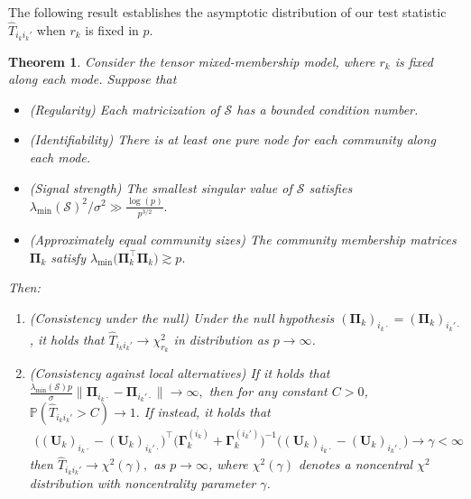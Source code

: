 \documentclass[10pt]{article}
\newcommand{\0}{{\mathbf{0}}}
\newcommand{\1}{{\mathbf{1}}}
\newcommand{\U}{{\mathbf{U}}}
\renewcommand{\t}{^{\top}}
\newtheorem{theorem}{Theorem}
\newcommand{\p}{\mathbb{P}}
\renewcommand{\hat}{\widehat}
\renewcommand{\hat}{\widehat}
\begin{document}
The following result establishes the asymptotic distribution of our test statistic  $\hat T_{i_k i_k'}$ when $r_k$ is fixed in $p$. 
\begin{theorem}\label{cor:testing}
Consider the tensor mixed-membership model, where $r_k$ is fixed along each mode.  Suppose that
\begin{itemize}
\item (Regularity) Each matricization of $\mathcal{S}$ has a bounded condition number.
\item (Identifiability) There is at least one pure node for each community along each mode.  
\item (Signal strength) The smallest singular value of $\mathcal{S}$ satisfies $\lambda_{\min}(\mathcal{S})^2/\sigma^2 \gg \frac{\log(p)}{p^{3/2}}.$
\item (Approximately equal community sizes) The community membership matrices $\mathbf{\Pi}_k$ satisfy $\lambda_{\min} \bigg( \mathbf{\Pi}_k\t \mathbf{\Pi}_k \bigg) \gtrsim p.$
\end{itemize}
Then:
\begin{enumerate}
    \item (Consistency under the null) Under the null hypothesis $(\mathbf{\Pi}_k)_{i_k\cdot} = (\mathbf{\Pi}_k)_{i_k'\cdot}$, it holds that
    $\hat T_{i_k i_k'} \to \chi^2_{r_k}$
in distribution as $p \to \infty$.
\item (Consistency against local alternatives) If it holds that $%
    \frac{\lambda_{\min}(\mathcal{S}) p }{\sigma} \| \mathbf{\Pi}_{i_k\cdot} - \mathbf{\Pi}_{i_k'\cdot} \| \to \infty,$
then for any constant $C > 0$, 
$    \p( \hat T_{i_k i_k'} > C ) \to 1.$
If instead, it holds that
\begin{align*}
    \big( (\U_k)_{i_k\cdot} - (\U_k)_{i_k'\cdot} \big)\t \bigg( \mathbf{\Gamma}^{(i_k)}_k + \mathbf{\Gamma}^{(i_k')}_{k} \bigg)^{-1}\big((\U_k)_{i_k\cdot} - (\U_k)_{i_k'\cdot} \big) \to \gamma < \infty
\end{align*}
then %
$    \hat T_{i_k i_k'} \to \chi^2(\gamma),$
as $p \to \infty$, where $\chi^2(\gamma)$ denotes a noncentral $\chi^2$ distribution with noncentrality parameter $\gamma$. 
\end{enumerate}
\end{theorem}
\end{document}
